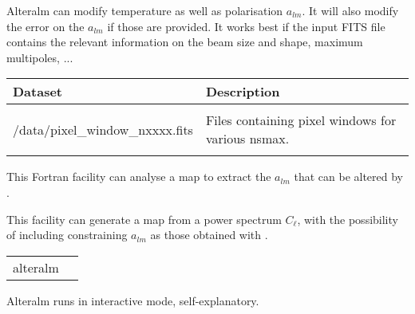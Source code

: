 \begin{qualifiers}
\begin{qulist}{}
  \end{qulist}
\end{qualifiers}

\begin{codedescription}
{%
Alteralm can modify temperature as well as polarisation $a_{lm}$. It will also
modify the error on the $a_{lm}$ if those are provided. It works best if the
input FITS file contains the relevant information on the beam size and shape,
maximum multipoles, ...
}
\end{codedescription}

\begin{datasets}
{
\begin{tabular}{p{0.3\hsize} p{0.35\hsize}} \hline  
  \textbf{Dataset} & \textbf{Description} \\ \hline
                   &                      \\ %
  /data/pixel\_window\_nxxxx.fits & Files containing pixel windows for
                   various nsmax.\\ 
                   &                      \\ \hline %
\end{tabular}
} 
\end{datasets}

\begin{support}
  \begin{sulist}{} %
  \item[\htmlref{anafast}{fac:anafast}] This \healpix Fortran facility can
     	       analyse a \healpix map to extract the $a_{lm}$ that can be
     	       altered by \thedocid.
  \item[\htmlref{synfast}{fac:synfast}] This \healpix facility can generate a
  \healpix map from a power spectrum $C_\ell$, with the possibility of including
  constraining $a_{lm}$ as those obtained with \thedocid.
		
  \end{sulist}
\end{support}

\begin{examples}{1}
{
\begin{tabular}{ll} %
alteralm  \\
\end{tabular}
}
{
Alteralm runs in interactive mode, self-explanatory.
}
\end{examples}


